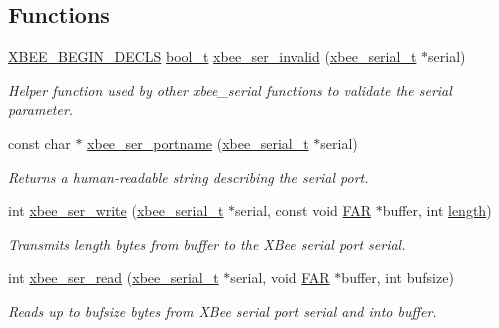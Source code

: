 \subsection*{Functions}
\begin{DoxyCompactItemize}
\item 
\hyperlink{group__hal_ga336bff4f4a6012aacc4468132bbd3d7f}{X\+B\+E\+E\+\_\+\+B\+E\+G\+I\+N\+\_\+\+D\+E\+C\+LS} \hyperlink{group__hal__dos_ga04dd5074964518403bf944f2b240a5f8}{bool\+\_\+t} \hyperlink{group__xbee__serial_gae7f838b59f553507bf81a86042fe9cd7}{xbee\+\_\+ser\+\_\+invalid} (\hyperlink{structxbee__serial__t}{xbee\+\_\+serial\+\_\+t} $\ast$serial)
\begin{DoxyCompactList}\small\item\em Helper function used by other xbee\+\_\+serial functions to validate the {\itshape serial} parameter. \end{DoxyCompactList}\item 
const char $\ast$ \hyperlink{group__xbee__serial_ga898057d1b7645785e7f3d6256828d039}{xbee\+\_\+ser\+\_\+portname} (\hyperlink{structxbee__serial__t}{xbee\+\_\+serial\+\_\+t} $\ast$serial)
\begin{DoxyCompactList}\small\item\em Returns a human-\/readable string describing the serial port. \end{DoxyCompactList}\item 
int \hyperlink{group__xbee__serial_ga2ca4e60c9d642084afa52dff9e1f6be4}{xbee\+\_\+ser\+\_\+write} (\hyperlink{structxbee__serial__t}{xbee\+\_\+serial\+\_\+t} $\ast$serial, const void \hyperlink{group__hal_gaef060b3456fdcc093a7210a762d5f2ed}{F\+AR} $\ast$buffer, int \hyperlink{group__zdo_gab2b3adeb2a67e656ff030b56727fd0ac}{length})
\begin{DoxyCompactList}\small\item\em Transmits {\itshape length} bytes from {\itshape buffer} to the X\+Bee serial port {\itshape serial}. \end{DoxyCompactList}\item 
int \hyperlink{group__xbee__serial_ga8263312373c03a79a718142e051b3342}{xbee\+\_\+ser\+\_\+read} (\hyperlink{structxbee__serial__t}{xbee\+\_\+serial\+\_\+t} $\ast$serial, void \hyperlink{group__hal_gaef060b3456fdcc093a7210a762d5f2ed}{F\+AR} $\ast$buffer, int bufsize)
\begin{DoxyCompactList}\small\item\em Reads up to {\itshape bufsize} bytes from X\+Bee serial port {\itshape serial} and into {\itshape buffer}. \end{DoxyCompactList}\item 

\end{DoxyCompactItemize}
